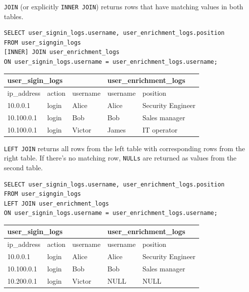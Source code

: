 \documentclass[9pt]{innovativeinnovation-cheatsheet}
\begin{document}
\begin{multicols}{3}
\newline
{}
\texttt{JOIN} (or explicitly \texttt{INNER JOIN}) returns rows that have matching values in both tables.
\\[-18pt]
\begin{lstlisting}[style=code_style]
SELECT user_signin_logs.username, user_enrichment_logs.position
FROM user_signgin_logs
[INNER] JOIN user_enrichment_logs
ON user_signin_logs.username = user_enrichment_logs.username;
\end{lstlisting}
\scriptsize	
\begin{tabular}{| m{4em} | m{4em} | m{4em} || m{4em} | m{8em} | }
      \hline
      \multicolumn{3}{l}{user\_sigin\_logs} & \multicolumn{2}{l}{user\_enrichment\_logs} \\
      \hline
      \hline
      ip\_address & action & username & username  & position \\
      \hline
      10.0.0.1 & login & \cellcolor{blue!25} Alice & \cellcolor{blue!25} Alice & Security Engineer \\
      \hline
      10.100.0.1 & login & \cellcolor{blue!25} Bob & \cellcolor{blue!25} Bob & Sales manager \\
      \hline
      10.100.0.1 & login & Victor & James & IT operator \\
      \hline
\end{tabular}

\texttt{LEFT JOIN} returns all rows from the left table with corresponding rows from the right table. If there's no matching row, \texttt{NULLs} are returned as values from the second
table.
\begin{lstlisting}[style=code_style]
SELECT user_signin_logs.username, user_enrichment_logs.position
FROM user_signgin_logs
LEFT JOIN user_enrichment_logs
ON user_signin_logs.username = user_enrichment_logs.username;
\end{lstlisting}
\scriptsize	
\begin{tabular}{| m{4em} | m{4em} | m{4em} || m{4em} | m{8em} | }
      \hline
      \multicolumn{3}{l}{user\_sigin\_logs} & \multicolumn{2}{l}{user\_enrichment\_logs} \\
      \hline
      \hline
      ip\_address & action & username & username  & position \\
      \hline
      10.0.0.1 & login & \cellcolor{blue!25} Alice & \cellcolor{blue!25} Alice & Security Engineer \\
      \hline
      10.100.0.1 & login & \cellcolor{blue!25} Bob & \cellcolor{blue!25} Bob & Sales manager \\
      \hline
      10.200.0.1 & login & \cellcolor{blue!25} Victor & \cellcolor{blue!25} NULL & NULL \\
      \hline
\end{tabular}


\end{multicols}
\end{document}
